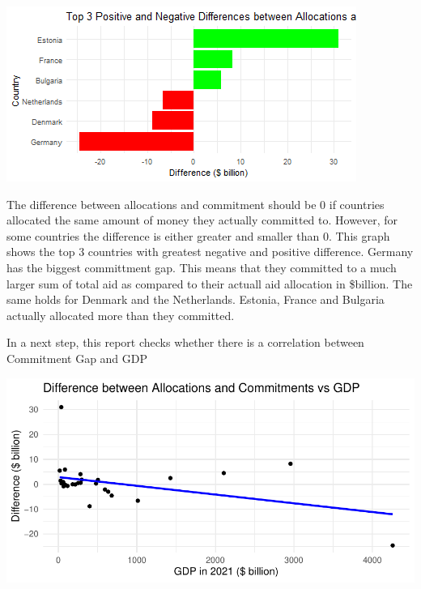\documentclass[11pt,preprint, authoryear]{elsarticle}
\let\origfigure\figure
\let\endorigfigure\endfigure
\renewenvironment{figure}[1][2] {
    \expandafter\origfigure\expandafter[H]
} {
    \endorigfigure
}
\numberwithin{equation}{section}
\numberwithin{figure}{section}
\numberwithin{table}{section}
\begin{document}
\begin{figure}[H]

{\centering \includegraphics{Question3_files/figure-latex/Figure2-1} 

}

\caption{Commitment Gap \label{Figure2}}\label{fig:Figure2}
\end{figure}

The difference between allocations and commitment should be 0 if
countries allocated the same amount of money they actually committed to.
However, for some countries the difference is either greater and smaller
than 0. This graph shows the top 3 countries with greatest negative and
positive difference. Germany has the biggest committment gap. This means
that they committed to a much larger sum of total aid as compared to
their actuall aid allocation in \$billion. The same holds for Denmark
and the Netherlands. Estonia, France and Bulgaria actually allocated
more than they committed.

In a next step, this report checks whether there is a correlation
between Commitment Gap and GDP

\begin{figure}[H]

{\centering \includegraphics{Question3_files/figure-latex/Figure3-1} 

}

\caption{Commitment Gap and GDP \label{Figure3}}\label{fig:Figure3}
\end{figure}
\end{document}
